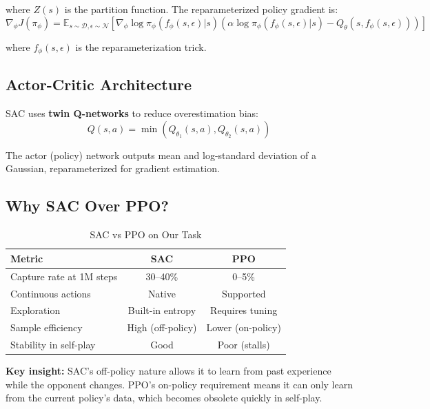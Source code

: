 \documentclass[11pt,a4paper]{report}
\begin{document}
where $Z(s)$ is the partition function. The reparameterized policy gradient is:
\begin{equation}
    \nabla_\phi J(\pi_\phi) = \mathbb{E}_{s \sim \mathcal{D}, \epsilon \sim \mathcal{N}}\left[ \nabla_\phi \log \pi_\phi(f_\phi(s,\epsilon)|s) \left( \alpha \log \pi_\phi(f_\phi(s,\epsilon)|s) - Q_\theta(s, f_\phi(s,\epsilon)) \right) \right]
\end{equation}

where $f_\phi(s, \epsilon)$ is the reparameterization trick.

\subsection{Actor-Critic Architecture}

SAC uses \textbf{twin Q-networks} to reduce overestimation bias:
\begin{equation}
    Q(s,a) = \min(Q_{\theta_1}(s,a), Q_{\theta_2}(s,a))
\end{equation}

The actor (policy) network outputs mean and log-standard deviation of a Gaussian, reparameterized for gradient estimation.

\subsection{Why SAC Over PPO?}

\begin{table}[h]
\centering
\caption{SAC vs PPO on Our Task}
\label{tab:sac-vs-ppo}
\begin{tabular}{@{}lcc@{}}
\toprule
\textbf{Metric} & \textbf{SAC} & \textbf{PPO} \\
\midrule
Capture rate at 1M steps & 30--40\% & 0--5\% \\
Continuous actions & Native & Supported \\
Exploration & Built-in entropy & Requires tuning \\
Sample efficiency & High (off-policy) & Lower (on-policy) \\
Stability in self-play & Good & Poor (stalls) \\
\bottomrule
\end{tabular}
\end{table}

\textbf{Key insight:} SAC's off-policy nature allows it to learn from past experience while the opponent changes. PPO's on-policy requirement means it can only learn from the current policy's data, which becomes obsolete quickly in self-play.
\end{document}
